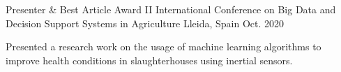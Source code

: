 

\begin{cventries}

  \cventry
    {Presenter \& Best Article Award} %
      {II International Conference on Big Data and Decision Support Systems in Agriculture} %
    {Lleida, Spain} %
    {Oct. 2020} %
    {
      \begin{cvitems} %
        \item {Presented a research work on the usage of machine learning algorithms to improve health conditions in slaughterhouses using inertial sensors.}
      \end{cvitems}
    }

\end{cventries}
